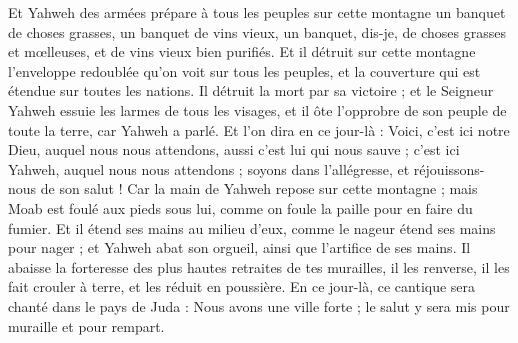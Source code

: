 \begin{multicols}{2}
Et Yahweh des armées prépare à tous les peuples sur cette montagne un banquet de choses grasses, un banquet de vins vieux, un banquet, dis-je, de choses grasses et mœlleuses, et de vins vieux bien purifiés.
Et il détruit sur cette montagne l'enveloppe redoublée qu'on voit sur tous les peuples, et la couverture qui est étendue sur toutes les nations.
Il détruit la mort par sa victoire ; et le Seigneur Yahweh essuie les larmes de tous les visages, et il ôte l'opprobre de son peuple de toute la terre, car Yahweh a parlé.
Et l'on dira en ce jour-là : Voici, c'est ici notre Dieu, auquel nous nous attendons, aussi c'est lui qui nous sauve ; c'est ici Yahweh, auquel nous nous attendons ; soyons dans l'allégresse, et réjouissons-nous de son salut !
Car la main de Yahweh repose sur cette montagne ; mais Moab est foulé aux pieds sous lui, comme on foule la paille pour en faire du fumier.
Et il étend ses mains au milieu d'eux, comme le nageur étend ses mains pour nager ; et Yahweh abat son orgueil, ainsi que l'artifice de ses mains.
Il abaisse la forteresse des plus hautes retraites de tes murailles, il les renverse, il les fait crouler à terre, et les réduit en poussière.
\VerseOne{}En ce jour-là, ce cantique sera chanté dans le pays de Juda : Nous avons une ville forte ; le salut y sera mis pour muraille et pour rempart.

\end{multicols}
